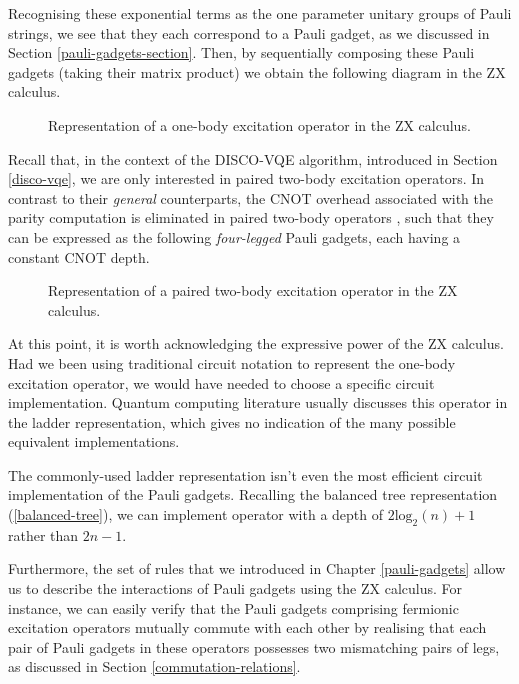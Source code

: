 Recognising these exponential terms as the one parameter unitary groups of Pauli strings, we see that they each correspond to a Pauli gadget, as we discussed in Section \ref{pauli-gadgets-section}. Then, by sequentially composing these Pauli gadgets (taking their matrix product) we obtain the following diagram in the ZX calculus. 

\begin{figure}[H]
    \centering
    \caption{Representation of a one-body excitation operator in the ZX calculus.}
\end{figure}

Recall that, in the context of the DISCO-VQE algorithm, introduced in Section \ref{disco-vqe}, we are only interested in paired two-body excitation operators. In contrast to their \textit{general} counterparts, the CNOT overhead associated with the parity computation is eliminated in paired two-body operators \cite{Burton2023}, such that they can be expressed as the following \textit{four-legged} Pauli gadgets, each having a constant CNOT depth.

\begin{figure}[H]
    \centering
    \caption{Representation of a paired two-body excitation operator in the ZX calculus.}
\end{figure}

At this point, it is worth acknowledging the expressive power of the ZX calculus. Had we been using traditional circuit notation to represent the one-body excitation operator, we would have needed to choose a specific circuit implementation. Quantum computing literature usually discusses this operator in the ladder representation, which gives no indication of the many possible equivalent implementations.


The commonly-used ladder representation isn't even the most efficient circuit implementation of the Pauli gadgets. Recalling the balanced tree representation (\ref{balanced-tree}), we can implement operator with a depth of $2\text{log}_2(n) + 1$ rather than $2n - 1$.


Furthermore, the set of rules that we introduced in Chapter \ref{pauli-gadgets} allow us to describe the interactions of Pauli gadgets using the ZX calculus. For instance, we can easily verify that the Pauli gadgets comprising fermionic excitation operators mutually commute with each other by realising that each pair of Pauli gadgets in these operators possesses two mismatching pairs of legs, as discussed in Section \ref{commutation-relations}.
